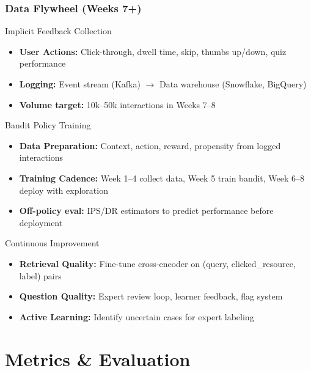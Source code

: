 \documentclass[aspectratio=169]{beamer}
\begin{document}
\begin{frame}
\frametitle{Data Flywheel (Weeks 7+)}
\begin{block}{Implicit Feedback Collection}
\begin{itemize}
\item \textbf{User Actions:} Click-through, dwell time, skip, thumbs up/down, quiz performance
\item \textbf{Logging:} Event stream (Kafka) $\rightarrow$ Data warehouse (Snowflake, BigQuery)
\item \textbf{Volume target:} 10k--50k interactions in Weeks 7--8
\end{itemize}
\end{block}

\begin{block}{Bandit Policy Training}
\begin{itemize}
\item \textbf{Data Preparation:} Context, action, reward, propensity from logged interactions
\item \textbf{Training Cadence:} Week 1--4 collect data, Week 5 train bandit, Week 6--8 deploy with exploration
\item \textbf{Off-policy eval:} IPS/DR estimators to predict performance before deployment
\end{itemize}
\end{block}

\begin{block}{Continuous Improvement}
\begin{itemize}
\item \textbf{Retrieval Quality:} Fine-tune cross-encoder on (query, clicked\_resource, label) pairs
\item \textbf{Question Quality:} Expert review loop, learner feedback, flag system
\item \textbf{Active Learning:} Identify uncertain cases for expert labeling
\end{itemize}
\end{block}
\end{frame}

\section{Metrics \& Evaluation}
\end{document}
